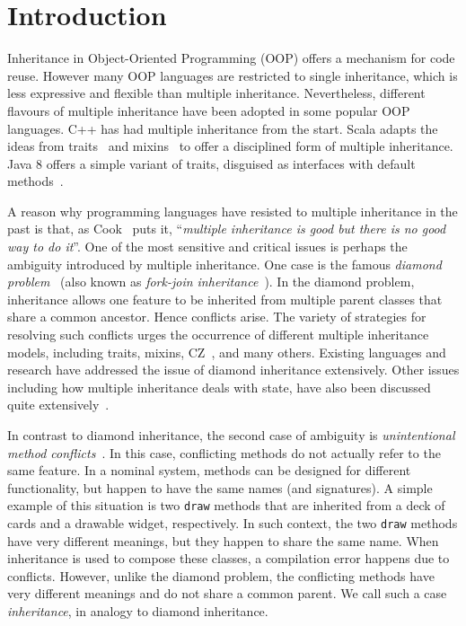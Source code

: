 \section{Introduction}
Inheritance in Object-Oriented Programming (OOP) offers a mechanism
for code reuse. However many OOP languages are restricted to single
inheritance, which is less expressive and flexible than multiple
inheritance. Nevertheless, different flavours of multiple inheritance
have been adopted in some popular OOP languages. C++ has had 
multiple inheritance from the start. Scala adapts the ideas from traits~\cite{scharli03traits,Ducasse:2006:TMF:1119479.1119483,Liquori08ftj}
and mixins~\cite{bracha90mixin,Flatt1998,van1996encapsulation,Ancona2003,Hendler86} to offer a disciplined form of multiple inheritance. Java 8 
offers a simple variant of traits, disguised as interfaces with default methods~\cite{goetz12fdefenders}.

A reason why programming languages have resisted to multiple
inheritance in the past is that, as Cook~\cite{Cook1987} puts it, 
``\emph{multiple inheritance is good but there is no good way to do it}''.
One of the most sensitive and critical issues is perhaps the ambiguity
introduced by multiple inheritance. One case is the famous
\textit{diamond problem}~\cite{Sak89dis,Singh1995} (also known as 
\emph{fork-join inheritance}~\cite{Sak89dis}). 
In the diamond problem, inheritance allows
one feature to be inherited from multiple parent classes that share a
common ancestor. Hence
conflicts arise. The variety of strategies for resolving such conflicts
urges the occurrence of different multiple inheritance models,
including traits, mixins, CZ~\cite{malayeri2009cz}, and many others. Existing
languages and research have addressed the issue of diamond inheritance extensively. Other issues
including how multiple inheritance deals with state, 
have also been discussed quite extensively~\cite{classless,malayeri2009cz,stroustrup1995}.

In contrast to diamond inheritance, the second case of ambiguity
is \textit{unintentional method conflicts}~\cite{scharli03traits}. In
this case, conflicting 
methods do not actually refer to the same feature. 
In a nominal system, methods can be designed for different
functionality, but happen to have the same names (and signatures).
A simple example of this situation is two \lstinline{draw} methods that
are inherited from a deck of cards and a drawable widget, respectively. 
In such context, the two \lstinline{draw} methods have very different meanings, 
but they happen to share the same name.
When inheritance is used to compose these classes, a compilation 
error happens due to conflicts. However, unlike the diamond problem,
the conflicting methods have very different meanings and do not share a
common parent. We call such a case \textit{\wordfork{} inheritance}, in
analogy to diamond inheritance.


